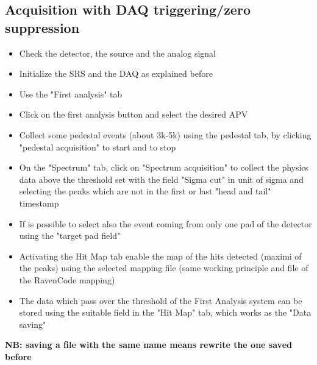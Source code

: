 \documentclass[a4paper,12pt]{article}
\begin{document}
		\subsection{Acquisition \textbf{with} DAQ triggering/zero suppression}
			\begin{itemize}
				\item Check the detector, the source and the analog signal
				\item Initialize the SRS and the DAQ as explained before
				\item Use the "First analysis" tab
				\item Click on the first analysis button and select the desired APV 
				\item Collect some pedestal events (about 3k-5k) using the pedestal tab, by clicking "pedestal acquisition" to start and to stop
				\item On the "Spectrum" tab, click on "Spectrum acquisition" to collect the physics data above the threshold set with the field "Sigma cut" in unit of sigma and selecting the peaks which are not in the first or last "head and tail" timestamp
				\item If is possible to select also the event coming from only one pad of the detector using the "target pad field"
				\item Activating the Hit Map tab enable the map of the hits detected (maximi of the peaks) using the selected mapping file (same working principle and file of the RavenCode mapping)
				\item The data which pass over the threshold of the First Analysis system can be stored using the suitable field in the "Hit Map" tab, which works as the "Data saving"
			\end{itemize}
			\textbf{NB: saving a file with the same name means rewrite the one saved before}
\end{document}
